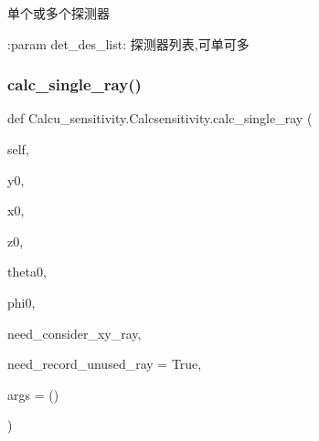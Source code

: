 \begin{DoxyVerb}单个或多个探测器

:param det_des_list: 探测器列表,可单可多
\end{DoxyVerb}
 \mbox{\label{classCalcu__sensitivity_1_1Calcsensitivity_a7441d0b4067ad69833a78eb21461d596}} 
\subsubsection{\texorpdfstring{calc\+\_\+single\+\_\+ray()}{calc\_single\_ray()}}
{\footnotesize\ttfamily def Calcu\+\_\+sensitivity.\+Calcsensitivity.\+calc\+\_\+single\+\_\+ray (\begin{DoxyParamCaption}\item[{}]{self,  }\item[{}]{y0,  }\item[{}]{x0,  }\item[{}]{z0,  }\item[{}]{theta0,  }\item[{}]{phi0,  }\item[{}]{need\+\_\+consider\+\_\+xy\+\_\+ray,  }\item[{}]{need\+\_\+record\+\_\+unused\+\_\+ray = {\ttfamily True},  }\item[{}]{args = {\ttfamily ()} }\end{DoxyParamCaption})}

